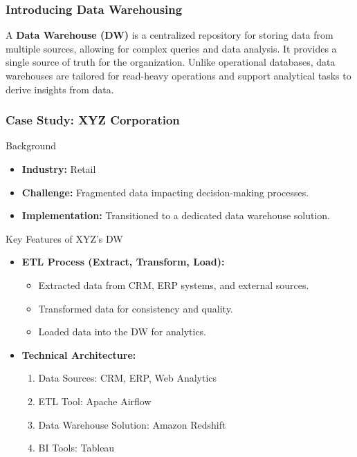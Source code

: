 \documentclass[aspectratio=169]{beamer}
\begin{document}
\begin{frame}[fragile]
    \frametitle{Introducing Data Warehousing}
    A \textbf{Data Warehouse (DW)} is a centralized repository for storing data from multiple sources,
    allowing for complex queries and data analysis. It provides a single source of truth for the organization.
    Unlike operational databases, data warehouses are tailored for read-heavy operations and support
    analytical tasks to derive insights from data.
\end{frame}

\begin{frame}[fragile]
    \frametitle{Case Study: XYZ Corporation}
    \begin{block}{Background}
        \begin{itemize}
            \item \textbf{Industry:} Retail
            \item \textbf{Challenge:} Fragmented data impacting decision-making processes.
            \item \textbf{Implementation:} Transitioned to a dedicated data warehouse solution.
        \end{itemize}
    \end{block}

    \begin{block}{Key Features of XYZ's DW}
        \begin{itemize}
            \item \textbf{ETL Process (Extract, Transform, Load):}
                \begin{itemize}
                    \item Extracted data from CRM, ERP systems, and external sources.
                    \item Transformed data for consistency and quality.
                    \item Loaded data into the DW for analytics.
                \end{itemize}
            \item \textbf{Technical Architecture:}
                \begin{enumerate}
                    \item Data Sources: CRM, ERP, Web Analytics
                    \item ETL Tool: Apache Airflow
                    \item Data Warehouse Solution: Amazon Redshift
                    \item BI Tools: Tableau
                \end{enumerate}
        \end{itemize}
    \end{block}
\end{frame}
\end{document}
